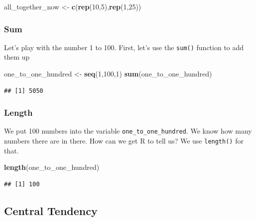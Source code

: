 \documentclass[]{book}
\newenvironment{Shaded}{\begin{snugshade}}{\end{snugshade}}
\newcommand{\KeywordTok}[1]{\textcolor[rgb]{0.13,0.29,0.53}{\textbf{#1}}}
\newcommand{\DecValTok}[1]{\textcolor[rgb]{0.00,0.00,0.81}{#1}}
\newcommand{\StringTok}[1]{\textcolor[rgb]{0.31,0.60,0.02}{#1}}
\newcommand{\NormalTok}[1]{#1}
\begin{document}
\begin{Shaded}
\begin{Highlighting}[]
\NormalTok{all_together_now <-}\StringTok{ }\KeywordTok{c}\NormalTok{(}\KeywordTok{rep}\NormalTok{(}\DecValTok{10}\NormalTok{,}\DecValTok{5}\NormalTok{),}\KeywordTok{rep}\NormalTok{(}\DecValTok{1}\NormalTok{,}\DecValTok{25}\NormalTok{)) }
\end{Highlighting}
\end{Shaded}

\subsubsection{Sum}\label{sum}

Let's play with the number 1 to 100. First, let's use the \texttt{sum()}
function to add them up

\begin{Shaded}
\begin{Highlighting}[]
\NormalTok{one_to_one_hundred <-}\StringTok{ }\KeywordTok{seq}\NormalTok{(}\DecValTok{1}\NormalTok{,}\DecValTok{100}\NormalTok{,}\DecValTok{1}\NormalTok{)}
\KeywordTok{sum}\NormalTok{(one_to_one_hundred)}
\end{Highlighting}
\end{Shaded}

\begin{verbatim}
## [1] 5050
\end{verbatim}

\subsubsection{Length}\label{length}

We put 100 numbers into the variable \texttt{one\_to\_one\_hundred}. We
know how many numbers there are in there. How can we get R to tell us?
We use \texttt{length()} for that.

\begin{Shaded}
\begin{Highlighting}[]
\KeywordTok{length}\NormalTok{(one_to_one_hundred)}
\end{Highlighting}
\end{Shaded}

\begin{verbatim}
## [1] 100
\end{verbatim}

\subsection{Central Tendency}\label{central-tendency}
\end{document}
